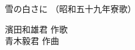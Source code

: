 \documentclass[10pt,b5j]{tarticle} %
\begin{document}
\begin{minipage}[c]{0.7\hsize} %
    \begin{center}
        {\LARGE
            雪の白さに %
        }
        {\small 
            （昭和五十九年寮歌） %
        }
    \end{center}
\end{minipage}
\begin{minipage}[c]{0.3\hsize} %
    \begin{flushright} %
        濱田和雄君 作歌\\青木毅君 作曲 %
    \end{flushright}
\end{minipage}
\end{document}
